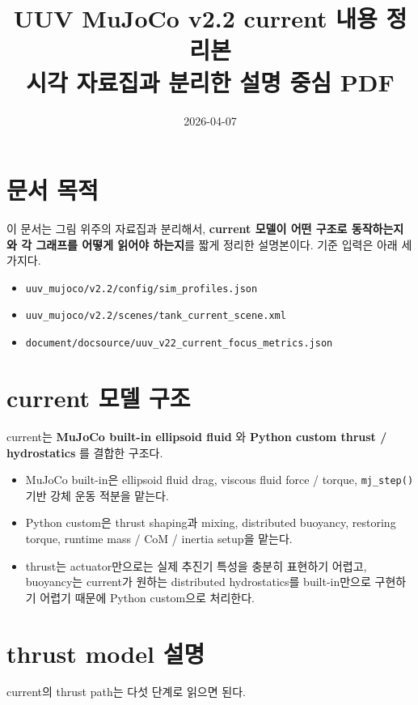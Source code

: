 \documentclass[11pt,a4paper]{article}
\title{UUV MuJoCo v2.2 current 내용 정리본\\
\large 시각 자료집과 분리한 설명 중심 PDF}
\author{}
\date{2026-04-07}
\newcommand{\code}[1]{\nolinkurl{#1}}
\begin{document}
\maketitle

\section{문서 목적}

이 문서는 그림 위주의 자료집과 분리해서, \textbf{current 모델이 어떤 구조로 동작하는지와 각 그래프를 어떻게 읽어야 하는지}를 짧게 정리한 설명본이다. 기준 입력은 아래 세 가지다.

\begin{itemize}[leftmargin=2em]
  \item \code{uuv\_mujoco/v2.2/config/sim\_profiles.json}
  \item \code{uuv\_mujoco/v2.2/scenes/tank\_current\_scene.xml}
  \item \code{document/docsource/uuv\_v22\_current\_focus\_metrics.json}
\end{itemize}

\section{current 모델 구조}

current는 \textbf{MuJoCo built-in ellipsoid fluid} 와 \textbf{Python custom thrust / hydrostatics} 를 결합한 구조다.

\begin{itemize}[leftmargin=2em]
  \item MuJoCo built-in은 ellipsoid fluid drag, viscous fluid force / torque, \code{mj\_step()} 기반 강체 운동 적분을 맡는다.
  \item Python custom은 thrust shaping과 mixing, distributed buoyancy, restoring torque, runtime mass / CoM / inertia setup을 맡는다.
  \item thrust는 actuator만으로는 실제 추진기 특성을 충분히 표현하기 어렵고, buoyancy는 current가 원하는 distributed hydrostatics를 built-in만으로 구현하기 어렵기 때문에 Python custom으로 처리한다.
\end{itemize}

\section{thrust model 설명}

current의 thrust path는 다섯 단계로 읽으면 된다.
\end{document}
